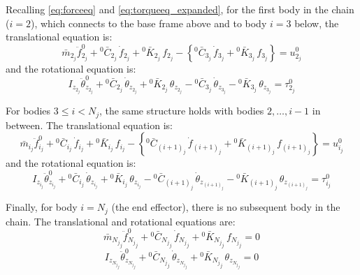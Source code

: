 \documentclass[11pt]{article}
\theoremstyle{definition}
\begin{document}
Recalling \eqref{eq:forceeq} and \eqref{eq:torqueeq_expanded}, for the first body in the chain ($i=2$), which connects to the base frame above and to body $i=3$ below, the translational equation is:
\begin{equation}
        \bar{m}_{2_j}
        \ddot{f}^{0}_{2_j}
        + {}^0\bar{C}_{2_j}\,\dot{f}_{2_j}
        + {}^0\bar{K}_{2_j}\,f_{2_j}
        - \left\{
            {}^0\bar{C}_{3_j}\,\dot{f}_{3_j} + {}^0\bar{K}_{3_j}\,f_{3_j}
        \right\}
        = u^0_{2_j}
\end{equation}
and the rotational equation is:
\begin{equation}
        I_{z_{2_j}}\ddot{\theta}^{0}_{z_{2_j}}
        + {}^0\bar{C}_{2_j}\,\dot{\theta}_{z_{2_j}}
        + {}^0\bar{K}_{2_j}\,\theta_{z_{2_j}}
        - {}^0\bar{C}_{3_j}\,\dot{\theta}_{z_{3_j}}
        - {}^0\bar{K}_{3_j}\,\theta_{z_{3_j}}
        = \tau^0_{2_j}
\end{equation}

For bodies $3\leq i< N_j$, the same structure holds with bodies $2, \dots, i-1$ in between. The translational equation is:
\begin{equation}
        \bar{m}_{i_j}
        \ddot{f}^{0}_{i_j}
        + {}^0\bar{C}_{i_j}\,\dot{f}_{i_j}
        + {}^0\bar{K}_{i_j}\,f_{i_j}
        -
        \left\{
            {}^0\bar{C}_{(i+1)_j}\,\dot{f}_{(i+1)_j} + {}^0\bar{K}_{(i+1)_j}\,f_{(i+1)_j}
        \right\}
        = u^0_{i_j}
\end{equation}
and the rotational equation is:
\begin{equation}
        I_{z_{i_j}}\ddot{\theta}^{0}_{z_{i_j}}
        + {}^0\bar{C}_{i_j}\,\dot{\theta}_{z_{i_j}}
        + {}^0\bar{K}_{i_j}\,\theta_{z_{i_j}}
        - {}^0\bar{C}_{(i+1)_j}\,\dot{\theta}_{z_{(i+1)_j}}
        - {}^0\bar{K}_{(i+1)_j}\,\theta_{z_{(i+1)_j}}
        = \tau^0_{i_j}
\end{equation}

Finally, for body $i = N_j$ (the end effector), there is no subsequent body in the chain. The translational and rotational equations are:
\begin{equation}
        \bar{m}_{{N_j}_j}
        \ddot{f}^{0}_{{N_j}_j}
        + {}^0\bar{C}_{{N_j}_j}\,\dot{f}_{{N_j}_j}
        + {}^0\bar{K}_{{N_j}_j}\,f_{{N_j}_j}
        = 0
\end{equation}
\begin{equation}
        I_{z_{{N_j}_j}}\ddot{\theta}^{0}_{z_{{N_j}_j}}
        + {}^0\bar{C}_{{N_j}_j}\,\dot{\theta}_{z_{{N_j}_j}}
        + {}^0\bar{K}_{{N_j}_j}\,\theta_{z_{{N_j}_j}}
        = 0
\end{equation}
\end{document}
